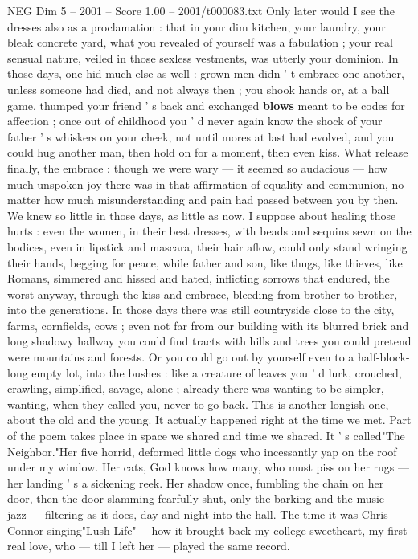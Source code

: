 \begin{textsample}{NEG Dim 5 – 2001 – Score 1.00 – 2001/t000083.txt}
Only later would I see the dresses also as a proclamation : that in your dim kitchen, your laundry, your bleak concrete yard, what you revealed of yourself was a fabulation ; your real sensual nature, veiled in those sexless vestments, was utterly your dominion.
In those days, one hid much else as well : grown men didn ' t embrace one another, unless someone had died, and not always then ; you shook hands or, at a ball game, thumped your friend ' s back and exchanged \textbf{blows} meant to be codes for affection ; once out of childhood you ' d never again know the shock of your father ' s whiskers on your cheek, not until mores at last had evolved, and you could hug another man, then hold on for a moment, then even kiss.
What release finally, the embrace : though we were wary — it seemed so audacious — how much unspoken joy there was in that affirmation of equality and communion, no matter how much misunderstanding and pain had passed between you by then.
We knew so little in those days, as little as now, I suppose about healing those hurts : even the women, in their best dresses, with beads and sequins sewn on the bodices, even in lipstick and mascara, their hair aflow, could only stand wringing their hands, begging for peace, while father and son, like thugs, like thieves, like Romans, simmered and hissed and hated, inflicting sorrows that endured, the worst anyway, through the kiss and embrace, bleeding from brother to brother, into the generations.
In those days there was still countryside close to the city, farms, cornfields, cows ; even not far from our building with its blurred brick and long shadowy hallway you could find tracts with hills and trees you could pretend were mountains and forests.
Or you could go out by yourself even to a half-block-long empty lot, into the bushes : like a creature of leaves you ' d lurk, crouched, crawling, simplified, savage, alone ; already there was wanting to be simpler, wanting, when they called you, never to go back.
This is another longish one, about the old and the young.
It actually happened right at the time we met.
Part of the poem takes place in space we shared and time we shared.
It ' s called"The Neighbor."Her five horrid, deformed little dogs who incessantly yap on the roof under my window.
Her cats, God knows how many, who must piss on her rugs — her landing ' s a sickening reek.
Her shadow once, fumbling the chain on her door, then the door slamming fearfully shut, only the barking and the music — jazz — filtering as it does, day and night into the hall.
The time it was Chris Connor singing"Lush Life"— how it brought back my college sweetheart, my first real love, who — till I left her — played the same record.

\end{textsample}
